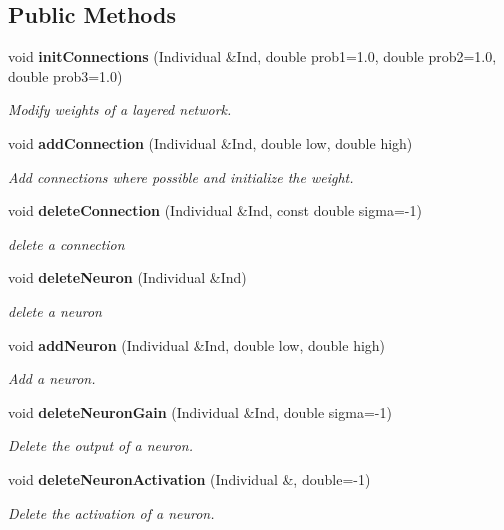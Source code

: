 \subsection*{Public Methods}
\begin{CompactItemize}
\item 
void {\bf init\-Connections} (Individual \&Ind, double prob1=1.0, double prob2=1.0, double prob3=1.0)
\begin{CompactList}\small\item\em Modify weights of a layered network.\item\end{CompactList}\item 
void {\bf add\-Connection} (Individual \&Ind, double low, double high)
\begin{CompactList}\small\item\em Add connections where possible and initialize the weight.\item\end{CompactList}\item 
void {\bf delete\-Connection} (Individual \&Ind, const double sigma=-1)
\begin{CompactList}\small\item\em delete a connection\item\end{CompactList}\item 
void {\bf delete\-Neuron} (Individual \&Ind)
\begin{CompactList}\small\item\em delete a neuron\item\end{CompactList}\item 
void {\bf add\-Neuron} (Individual \&Ind, double low, double high)
\begin{CompactList}\small\item\em Add a neuron.\item\end{CompactList}\item 
{}
void {\bf delete\-Neuron\-Gain} (Individual \&Ind, double sigma=-1)\label{classFFOps__OL__neu_a5}

\begin{CompactList}\small\item\em Delete the output of a neuron.\item\end{CompactList}\item 
{}
void {\bf delete\-Neuron\-Activation} (Individual \&, double=-1)\label{classFFOps__OL__neu_a6}

\begin{CompactList}\small\item\em Delete the activation of a neuron.\item\end{CompactList}\end{CompactItemize}


